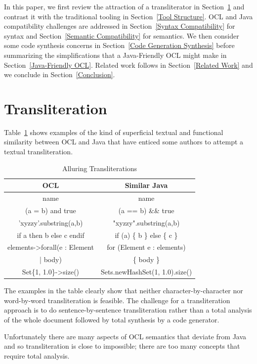 \documentclass[sigconf]{acmart}
\begin{document}
In this paper, we first review the attraction of a transliterator in Section~\ref{Transliteration} and contrast it with the traditional tooling in Section~\ref{Tool Structure}. OCL and Java compatibility challenges are addressed in Section~\ref{Syntax Compatibility} for syntax and Section~\ref{Semantic Compatibility} for semantics. We then consider some code synthesis concerns in Section~\ref{Code Generation Synthesis} before summarizing the simplifications that a Java-Friendly OCL might make in Section~\ref{Java-Friendly OCL}. Related work follows in Section~\ref{Related Work} and we conclude in Section~\ref{Conclusion}. 

\section{Transliteration}\label{Transliteration}

Table~\ref{tab:Transliterations} shows examples of the kind of superficial textual and functional similarity between OCL and Java that have enticed some authors to attempt a textual transliteration.

\begin{table}
\begin{tabular}{ c | c }
 OCL & Similar Java \\
 \hline
 \hline
 name & name \\
 \hline
 (a = b) and true & (a == b) \&\& true \\
 \hline
 'xyzzy'.substring(a,b) & "xyzzy".substring(a,b) \\
 \hline
if a then b else c endif & if (a) \{ b \} else \{ c \} \\
\hline
 elements->forall(e : Element & for (Element e : elements) \\
 | body) & \{ body \} \\
 \hline
Set\{1, 1.0\}->size() & Sets.newHashSet(1, 1.0).size() \\
\end{tabular}
\caption{Alluring Transliterations}
\label{tab:Transliterations}
\end{table}

The examples in the table clearly show that neither character-by-character nor word-by-word transliteration is feasible. The challenge for a transliteration approach is to do sentence-by-sentence transliteration rather than a total analysis of the whole document followed by total synthesis by a code generator.

Unfortunately there are many aspects of OCL semantics that deviate from Java and so transliteration is close to impossible; there are too many concepts that require total analysis.
\end{document}

